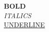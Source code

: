 \documentclass{article}
\begin{document}
\textbf{BOLD}\\

\textit{ITALICS}\\

\underline{UNDERLINE}\\
\end{document}
